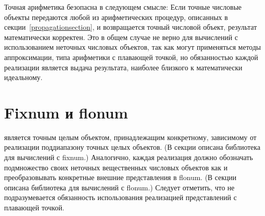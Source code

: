 Точная арифметика безопасна в следующем смысле: Если точные числовые объекты передаются любой из
арифметических процедур, описанных в секции~\ref{propagationsection}, и возвращается точный
числовой объект, результат математически корректен. Это в общем случае не верно для вычислений с
использованием неточных числовых объектов, так как могут применяться методы аппроксимации,
типа арифметики с плавающей точкой, но обязанностью каждой реализации является
выдача результата, наиболее близкого к математически идеальному.\vspace{0.6mm}

\section{Fixnum и flonum}\vspace{0.6mm}

 является точным целым объектом, принадлежащим конкретному, зависимому от
реализации поддиапазону точных целых объектов. (В секции 
описана библиотека для вычислений с fixnum.) Аналогично, каждая реализация должно обозначать
подмножество своих неточных вещественных числовых объектов как  и
преобразовывать конкретные внешние представления в flonum. (В секции
 описана библиотека для вычислений с flonum.) Следует
отметить, что не подразумевается обязанность использования реализацией представлений с плавающей
точкой.\vspace{0.6mm}

